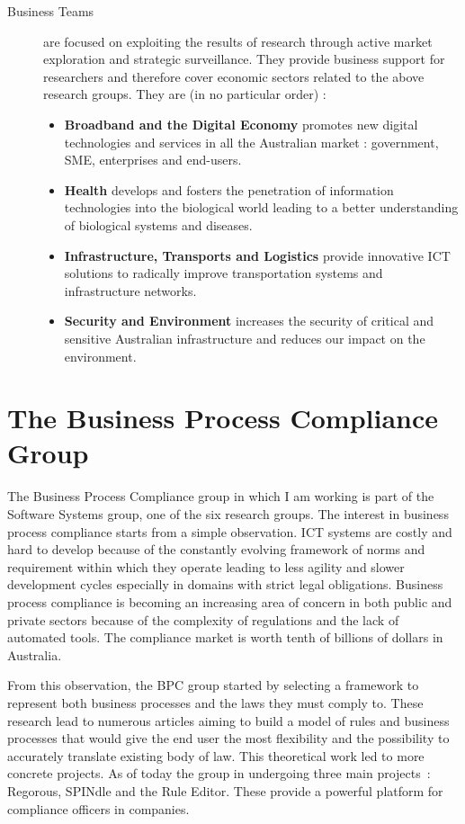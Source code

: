 \documentclass[10pt]{report}
\begin{document}
\begin{description}
\item[Business Teams] are focused on exploiting the results of research through active market exploration and strategic surveillance. They provide business support for researchers and therefore cover economic sectors related to the above research groups. They are (in no particular order) :
\begin{itemize}
\item \textbf{Broadband and the Digital Economy} promotes new digital technologies and services in all the Australian market : government, SME, enterprises and end-users.
\item \textbf{Health} develops and fosters the penetration of information technologies into the biological world leading to a better understanding of biological systems and diseases.
\item \textbf{Infrastructure, Transports and Logistics} provide innovative ICT solutions to radically improve transportation systems and infrastructure networks.
\item \textbf{Security and Environment} increases the security of critical and sensitive Australian infrastructure and reduces our impact on the environment.
\end{itemize}
\end{description}

\section{The Business Process Compliance Group}

The Business Process Compliance group in which I am working is part of the Software Systems group, one of the six research groups. The interest in business process compliance starts from a simple observation. ICT systems are costly and hard to develop because of the constantly evolving framework of norms and requirement within which they operate leading to less agility and slower development cycles especially in domains with strict legal obligations. Business process compliance is becoming an increasing area of concern in both public and private sectors because of the complexity of regulations and the lack of automated tools. The compliance market is worth tenth of billions of dollars in Australia.\autocite{BPCWebsite}

From this observation, the BPC group started by selecting a framework to represent both business processes and the laws they must comply to. These research lead to numerous articles aiming to build a model of rules and business processes that would give the end user the most flexibility and the possibility to accurately translate existing body of law. This theoretical work led to more concrete projects. As of today the group in undergoing three main projects~: Regorous, SPINdle and the Rule Editor. These provide a powerful platform for compliance officers in companies.
\end{document}
